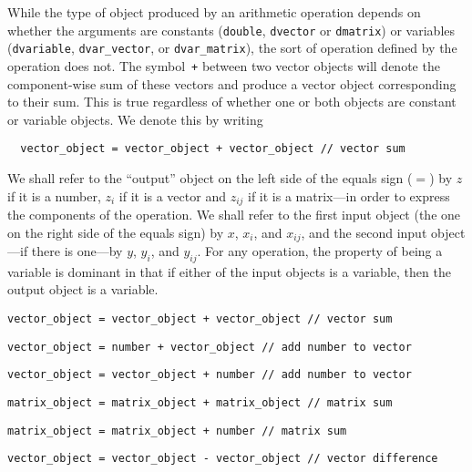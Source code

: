 \documentclass{admbmanual}
\begin{document}
While the type of object produced by an arithmetic operation depends
on whether the arguments are constants (\texttt{double}, \texttt{dvector} or \texttt{dmatrix})
or variables (\texttt{dvariable}, \texttt{dvar\_vector}, or \texttt{dvar\_matrix}),
the sort of operation defined by the operation does not.
The symbol~\texttt{+} between two vector objects will denote the component-wise
sum of these vectors and produce a vector object corresponding to their 
sum. This is true regardless of whether one or both objects are
constant or variable objects. We denote this by writing
\begin{lstlisting}
  vector_object = vector_object + vector_object // vector sum 
\end{lstlisting}

We shall refer to the ``output'' object on the left side of the equals 
sign ($=$) by $z$ if it is a number, $z_i$ if it is a vector and $z_{ij}$
if it is a matrix---in order to express the components of the
operation. We shall refer to the first input object (the one on the
right side of the equals sign)
by $x$, $x_i$, and $x_{ij}$,
and the second input object---if there is one---by
$y$, $y_i$, and $y_{ij}$.
For any operation, the property of being a variable is
dominant in that if either of the input objects
is a variable, then the output object is a variable.
\begin{lstlisting}
vector_object = vector_object + vector_object // vector sum 
\end{lstlisting}
\begin{lstlisting}
vector_object = number + vector_object // add number to vector 
\end{lstlisting}
\begin{lstlisting}
vector_object = vector_object + number // add number to vector 
\end{lstlisting}
\begin{lstlisting}
matrix_object = matrix_object + matrix_object // matrix sum 
\end{lstlisting}
\begin{lstlisting}
matrix_object = matrix_object + number // matrix sum 
\end{lstlisting}
\begin{lstlisting}
vector_object = vector_object - vector_object // vector difference 
\end{lstlisting}
\end{document}
